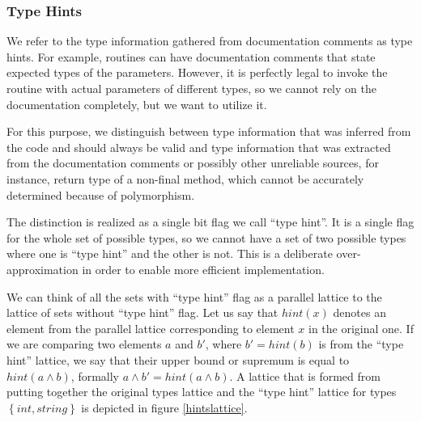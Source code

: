         \subsubsection*{Type Hints}        
        We refer to the type information gathered from documentation 
        comments as type hints. For example, routines can have 
        documentation comments that state expected types of the 
        parameters. However, it is perfectly legal to invoke the 
        routine with actual parameters of different types, so we 
        cannot rely on the documentation completely, but we want 
        to utilize it.
        
        For this purpose, we distinguish between type information 
        that was inferred from the code and should always be 
        valid and type information that was extracted from the 
        documentation comments or possibly other unreliable 
        sources, for instance, return type of a non-final method, 
        which cannot be accurately determined because of 
        polymorphism.
        
        The distinction is realized as a single bit flag 
        we call ``type hint''. It is a single flag for the 
        whole set of possible types, so we cannot have a 
        set of two possible types where one is ``type hint'' 
        and the other is not. This is a deliberate 
        over-approximation in order to enable more 
        efficient implementation.
        
        We can think of all the sets with ``type hint'' flag 
        as a parallel lattice to the lattice of sets without 
        ``type hint'' flag. Let us say that $hint(x)$ denotes 
        an element from the parallel lattice corresponding to 
        element $x$ in the original one. If we are comparing 
        two elements $a$ and $b'$, where $b'=hint(b)$ is from the 
        ``type hint'' lattice, we say that their upper bound or 
        supremum is equal to $hint(a\wedge{}b)$, formally 
        $a\wedge{}b'=hint(a\wedge{}b)$. A lattice that is formed 
        from putting together the original types lattice and the 
        ``type hint'' lattice for types $\left\{int, string\right\}$ 
        is depicted in figure \ref{hintslattice}.
        
